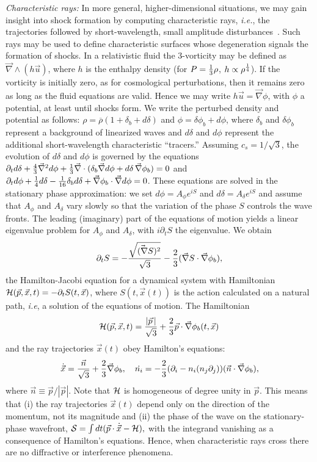 \documentclass[prl,aps,10pt,twocolumn,showkeys,nofootinbib]{revtex4-1}
\def\ben{\begin{equation}}
\def\een{\end{equation}}
\begin{document}
{\it Characteristic rays:} In more general, higher-dimensional situations, we may gain insight into shock formation by computing characteristic rays, {\it i.e.}, the trajectories followed by short-wavelength, small amplitude disturbances~\cite{LL}. Such rays may be used to define characteristic surfaces whose degeneration signals the formation of shocks. In a relativistic fluid the 3-vorticity may be defined as $\vec{\nabla}\wedge (h \vec{u})$, where $h$ is the enthalpy density (for $P={1\over 3} \rho$, $h\propto \rho^{1\over 4}$). If the vorticity is initially zero, as for cosmological perturbations, then it remains zero as long as the fluid equations are valid. Hence we may write $h \vec{u}=\vec{\nabla} \phi$, with $\phi$ a potential, at least until shocks form. We write the perturbed density and potential as follows: $\rho=\overline{\rho}(1+\delta_b+d \delta)$ and  $\phi=\delta \phi_{b}+ d\phi$, where $\delta_{b}$ and $\delta \phi_{b}$ represent a background of linearized waves and $d \delta$ and $d \phi$ represent the additional short-wavelength characteristic ``tracers.'' Assuming $c_s=1/\sqrt{3}$, the  evolution of $d \delta $ and $d \phi$ is governed by the equations $\partial_t d \delta+{4\over 3} \vec{\nabla}^2 d \phi +{1\over 3} \vec{\nabla}\cdot (\delta_{b}\vec{\nabla}d\phi+d \delta \,\vec{\nabla}\phi_{b} )=0$ and $\partial_t d \phi +{1\over 4} d \delta  - {1\over 16} \delta _{b} d\delta+\vec{\nabla}\phi_{b}\cdot\vec{\nabla} d\phi=0$. These equations are solved in the stationary phase approximation: we set $d\phi=A_\phi e^{i {S}}$ and $d\delta=A_\delta e^{i {S}}$ and assume that $A_\phi$ and $A_\delta$ vary slowly so that the variation of the phase $S$ controls the wave fronts. The leading (imaginary) part of the equations of motion yields a linear eigenvalue problem for $A_\phi$ and $A_\delta$, with $i\partial_t S$ the eigenvalue.  We obtain
\ben
\partial_t  { S}=-{\sqrt{\vec{(\nabla}S)^2}\over \sqrt{3}}-{2\over 3} (\vec{\nabla}S \cdot\vec{\nabla}\phi_{b}),
\label{eq4}
\een
the Hamilton-Jacobi equation for a dynamical system with Hamiltonian ${\cal H}(\vec{p},\vec{x},t) =-\partial_t  {S}(t,\vec{x})$, where ${ S}(t,\vec{x}(t))$ is the action calculated on a natural path, {\it i.e}, a solution of the equations of motion. The Hamiltonian
\ben
{\cal H}(\vec{p},\vec{x},t) ={|\vec{p}\,|\over \sqrt{3}}+{2\over 3} \vec{p} \cdot\vec{\nabla}\phi_{b}(t,\vec{x})
\label{eq5}
\een
and the ray trajectories $\vec{x}(t)$ obey Hamilton's equations:
\ben
\dot{\vec{x}}={\vec{n}\over \sqrt{3}} +{2\over 3} \vec{\nabla}\phi_{b}, \quad \dot{n_i}=-{2\over 3} (\partial_i-n_i(n_j\partial_j))(\vec{n}\cdot \vec{\nabla}\phi_{b}),
\label{eq6}
\een
where $\vec{n}\equiv \vec{p}/|\vec{p}|$. Note that ${\cal H}$  is homogeneous of degree unity in $\vec{p}$. This means that (i) the ray trajectories $\vec{x}(t)$ depend only on the direction of the momentum, not its magnitude and (ii) the phase of the wave on the stationary-phase wavefront,  ${\cal S}=\int dt( \vec{p}\cdot\dot{\vec{x}} -{\cal H}),$ with the integrand vanishing as a consequence of Hamilton's equations. Hence, when characteristic rays cross there are no diffractive or interference phenomena.
\end{document}
